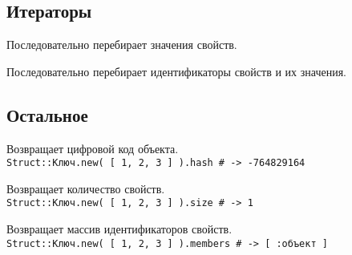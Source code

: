 \subsection*{Итераторы}

\begin{methodlist}
  Последовательно перебирает значения свойств. 
 
  Последовательно перебирает идентификаторы свойств и их значения. 
\end{methodlist}

\subsection*{Остальное} 

\begin{methodlist}
  Возвращает цифровой код объекта. 
  \\\verb!Struct::Kлюч.new( [ 1, 2, 3 ] ).hash # -> -764829164!

  Возвращает количество свойств. 
  \\\verb!Struct::Kлюч.new( [ 1, 2, 3 ] ).size # -> 1!

  Возвращает массив идентификаторов свойств. 
  \\\verb!Struct::Kлюч.new( [ 1, 2, 3 ] ).members # -> [ :объект ]!
\end{methodlist}